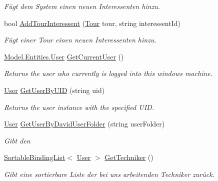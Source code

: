 \begin{DoxyCompactItemize}
\begin{DoxyCompactList}\small\item\em Fügt dem System einen neuen Interessenten hinzu. \end{DoxyCompactList}\item 
bool \hyperlink{class_products_1_1_model_1_1_model_service_acaef0ee60122ff078ad7839ccd91f7d1}{Add\+Tour\+Interessent} (\hyperlink{class_products_1_1_model_1_1_entities_1_1_tour}{Tour} tour, string interessent\+Id)
\begin{DoxyCompactList}\small\item\em Fügt einer Tour einen neuen Interessenten hinzu. \end{DoxyCompactList}\item 
\hyperlink{class_products_1_1_model_1_1_entities_1_1_user}{Model.\+Entities.\+User} \hyperlink{class_products_1_1_model_1_1_model_service_a46d44a1b993062662c1d9510c4b0563b}{Get\+Current\+User} ()
\begin{DoxyCompactList}\small\item\em Returns the user who currently is logged into this windows machine. \end{DoxyCompactList}\item 
\hyperlink{class_products_1_1_model_1_1_entities_1_1_user}{User} \hyperlink{class_products_1_1_model_1_1_model_service_ab814f682670cbd2640e6fa5aa3b2ad29}{Get\+User\+By\+U\+ID} (string uid)
\begin{DoxyCompactList}\small\item\em Returns the user instance with the specified U\+ID. \end{DoxyCompactList}\item 
\hyperlink{class_products_1_1_model_1_1_entities_1_1_user}{User} \hyperlink{class_products_1_1_model_1_1_model_service_a396e29e34ef218dce26e806423ad9827}{Get\+User\+By\+David\+User\+Folder} (string user\+Folder)
\begin{DoxyCompactList}\small\item\em Gibt den \end{DoxyCompactList}\item 
\hyperlink{class_products_1_1_common_1_1_sortable_binding_list}{Sortable\+Binding\+List}$<$ \hyperlink{class_products_1_1_model_1_1_entities_1_1_user}{User} $>$ \hyperlink{class_products_1_1_model_1_1_model_service_a7af0d16283100e365285dbcc4550d8f9}{Get\+Techniker} ()
\begin{DoxyCompactList}\small\item\em Gibt eine sortierbare Liste der bei uns arbeitenden Techniker zurück. \end{DoxyCompactList}\end{DoxyCompactItemize}
